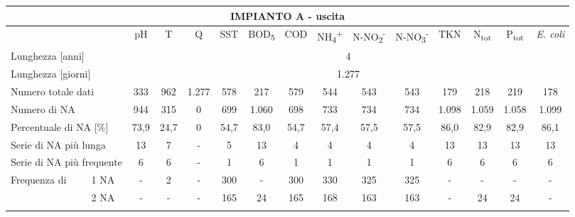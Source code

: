 \begin{sidewaystable}
\begin{center}
\scriptsize
	\begin{tabular}{|ll|c|c|c|c|c|c|c|c|c|c|c|c|c|}
		\hline
		\multicolumn{15}{|c|}{\textbf{IMPIANTO A - uscita}}                                                                                                     \\ \hline
	\multicolumn{2}{|l|}{}                           & pH   & T    & Q     & SST   & BOD\textsubscript{5}  & COD  & NH\textsubscript{4}\textsuperscript{+} & N-NO\textsubscript{2}\textsuperscript{-} & N-NO\textsubscript{3}\textsuperscript{-} & TKN  & N\textsubscript{tot}  & P\textsubscript{tot}  & \textit{E. coli} \\ \hline
		\multicolumn{2}{|l|}{Lunghezza {[}anni{]}}       & \multicolumn{13}{c|}{4}                                                                              \\ \hline
		\multicolumn{2}{|l|}{Lunghezza {[}giorni{]}}     & \multicolumn{13}{c|}{1.277}                                                                          \\ \hline
		\multicolumn{2}{|l|}{Numero totale dati}         & 333  & 962  & 1.277 & 578  & 217   & 579  & 544  & 543    & 543    & 179   & 218   & 219   & 178     \\ \hline
		\multicolumn{2}{|l|}{Numero di NA}               & 944  & 315  & 0     & 699  & 1.060 & 698  & 733  & 734    & 734    & 1.098 & 1.059 & 1.058 & 1.099    \\ \hline
		\multicolumn{2}{|l|}{Percentuale di NA {[}\%{]}} & 73,9 & 24,7 & 0     & 54,7 & 83,0  & 54,7 & 57,4 & 57,5   & 57,5   & 86,0  & 82,9  & 82,9  & 86,1    \\ \hline
		\multicolumn{2}{|l|}{Serie di NA più lunga}      & 13   & 7    & -     & 5    & 13    & 4    & 4    & 4      & 4      & 13    & 13    & 13    & 13      \\ \hline
		\multicolumn{2}{|l|}{Serie di NA più frequente}  & 6    & 6    & -     & 1    & 6     & 1    & 1    & 1      & 1      & 6     & 6     & 6     & 6       \\ \hline
		\multirow{12}{*}{Frequenza di}      & 1 NA       & -    & 2    & -     & 300  & -     & 300  & 330  & 325    & 325    & -     & -     & -     & -       \\ \cline{3-15} 
		& 2 NA       & -    & -    & -     & 165  & 24    & 165  & 168  & 163    & 163    & -     & 24    & 24    & -       \\ \cline{3-15} 

\end{tabular}
\end{center}
\end{sidewaystable}
